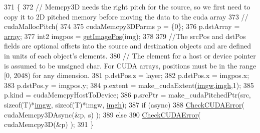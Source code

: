 \begin{DoxyCode}
371     \{
372         \textcolor{comment}{// Memcpy3D needs the right pitch for the source, so we first need to copy it to 2D pitched memory
       before moving the data to the cuda array}
373 \textcolor{comment}{//      cudaMallocPitch(}
374 
375         cudaMemcpy3DParms p = \{0\};
376         p.dstArray = \hyperlink{struct_image4_d_cuda_array_a4043697cb965dc8bd3dbc33f3840dd92}{array};
377         int2 imgpos = \hyperlink{struct_image4_d_cuda_array_a24b592522dd8418266cfb434cc09f40e}{getImagePos}(img);
378 
379         \textcolor{comment}{//The srcPos and dstPos fields are optional offsets into the source and destination objects and are
       defined in units of each object's elements. }
380         \textcolor{comment}{// The element for a host or device pointer is assumed to be unsigned char. For CUDA arrays,
       positions must be in the range [0, 2048) for any dimension. }
381         p.dstPos.z = layer;
382         p.dstPos.x = imgpos.x;
383         p.dstPos.y = imgpos.y;
384         p.extent = make\_cudaExtent(\hyperlink{struct_image4_d_cuda_array_a7f23302d874ffff216e49e33e9b5ca41}{imgw},\hyperlink{struct_image4_d_cuda_array_abdb9e7f88b589af46a4cf0b543ecac9b}{imgh},1);
385         p.kind = cudaMemcpyHostToDevice;
386         p.srcPtr = make\_cudaPitchedPtr(src, \textcolor{keyword}{sizeof}(T)*\hyperlink{struct_image4_d_cuda_array_a7f23302d874ffff216e49e33e9b5ca41}{imgw}, \textcolor{keyword}{sizeof}(T)*imgw, 
      \hyperlink{struct_image4_d_cuda_array_abdb9e7f88b589af46a4cf0b543ecac9b}{imgh});
387         \textcolor{keywordflow}{if} (async)
388             \hyperlink{gpu__utils_8h_ae6b059a7637782d61577e695c9d6303e}{CheckCUDAError}( cudaMemcpy3DAsync(&p, s) );
389         \textcolor{keywordflow}{else}
390             \hyperlink{gpu__utils_8h_ae6b059a7637782d61577e695c9d6303e}{CheckCUDAError}( cudaMemcpy3D(&p) );
391     \}
\end{DoxyCode}
